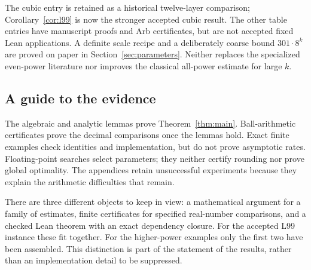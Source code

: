 The cubic entry is retained as a historical twelve-layer comparison;
Corollary~\ref{cor:l99} is now the stronger accepted cubic result.
The other table entries have manuscript proofs and Arb certificates,
but are not accepted fixed Lean applications. A definite scale recipe
and a deliberately coarse bound \(301\cdot8^k\) are proved on paper
in Section~\ref{sec:parameters}. Neither replaces the specialized
even-power literature nor improves the classical all-power estimate
for large \(k\).

\subsection{A guide to the evidence}

The algebraic and analytic lemmas prove Theorem~\ref{thm:main}.
Ball-arithmetic certificates prove the decimal comparisons once the
lemmas hold. Exact finite examples check identities and implementation,
but do not prove asymptotic rates. Floating-point searches select
parameters; they neither certify rounding nor prove global optimality.
The appendices retain unsuccessful experiments because they explain
the arithmetic difficulties that remain.

There are three different objects to keep in view: a mathematical
argument for a family of estimates, finite certificates for specified
real-number comparisons, and a checked Lean theorem with an exact
dependency closure. For the accepted L99 instance these fit together.
For the higher-power examples only the first two have been assembled.
This distinction is part of the statement of the results, rather than
an implementation detail to be suppressed.
